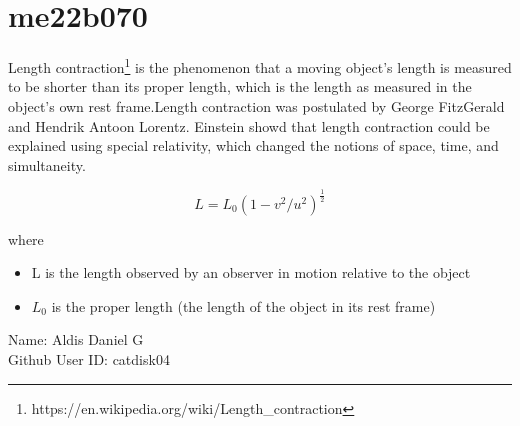 \section{me22b070}

Length contraction\footnote{https://en.wikipedia.org/wiki/Length\_contraction}
is the phenomenon that a moving object's length is measured to be shorter than its proper length, which is 
the length as measured in the object's own rest frame.Length contraction was postulated by George FitzGerald
and Hendrik Antoon Lorentz. Einstein showd that length contraction could be explained using special 
relativity, which changed the notions of space, time, and simultaneity.

\begin{equation}
	L=L_0(1-v^2/u^2)^\frac{1}{2}
\end{equation}

where 
\begin{itemize}
	\item L is the length observed by an observer in motion relative to the object
	\item $L_0$ is the proper length (the length of the object in its rest frame)
\end{itemize}

\begin{flushleft}
Name: Aldis Daniel G\\
Github User ID: catdisk04
\end{flushleft}
